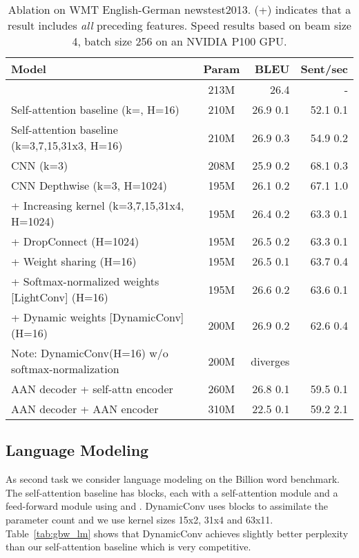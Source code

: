 \documentclass{article} \usepackage{iclr2019_conference,times}
\def\sdconv{LightConv}
\def\tvsdconv{DynamicConv}
\def\gbw{Billion word}
\begin{document}
\begin{table*}[t]
\centering
\begin{tabular}{lcrr}
\toprule
Model & Param & BLEU & Sent/sec \\
\midrule
\citet{vaswani2017transformer} & 213M & 26.4 & - \\
Self-attention baseline (k=, H=16) & 210M & 26.9  0.1 & 52.1  0.1 \\
Self-attention baseline (k=3,7,15,31x3, H=16) & 210M & 26.9  0.3 & 54.9  0.2 \\
\midrule
CNN (k=3) & 208M & 25.9  0.2 & 68.1  0.3 \\
CNN Depthwise (k=3, H=1024) & 195M & 26.1  0.2 & 67.1  1.0 \\
+ Increasing kernel (k=3,7,15,31x4, H=1024) & 195M  & 26.4  0.2 & 63.3  0.1 \\
+ DropConnect (H=1024) & 195M & 26.5  0.2 & 63.3  0.1 \\
+ Weight sharing (H=16) & 195M & 26.5  0.1 & 63.7  0.4 \\
+ Softmax-normalized weights [\sdconv] (H=16) & 195M & 26.6  0.2 & 63.6  0.1 \\
+ Dynamic weights [\tvsdconv] (H=16) & 200M & 26.9  0.2 & 62.6  0.4 \\
Note: \tvsdconv (H=16) w/o softmax-normalization & 200M & diverges  \\
\midrule
AAN decoder + self-attn encoder & 260M & 26.8  0.1 & 59.5  0.1 \\
AAN decoder + AAN encoder & 310M & 22.5  0.1 & 59.2  2.1 \\
\bottomrule
\end{tabular}
\caption{Ablation on WMT English-German newstest2013. 
(+) indicates that a result includes \emph{all} preceding features. 
Speed results based on beam size 4, batch size 256 on an NVIDIA P100 GPU.}
\label{tab:ablation}
\end{table*}



\subsection{Language Modeling}\label{sec:lm}

As second task we consider language modeling on the \gbw{} benchmark. 
The self-attention baseline has  blocks, each with a self-attention module and a feed-forward module using  and .
\tvsdconv{} uses  blocks to assimilate the parameter count and we use kernel sizes 15x2, 31x4 and 63x11.
Table~\ref{tab:gbw_lm} shows that \tvsdconv{} achieves slightly better perplexity than our self-attention baseline which is very competitive.
\end{document}
